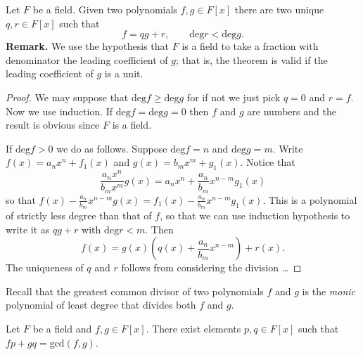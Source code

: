 \begin{theorem}
\label{theorem-division-algoritm-for-polynomials}
\begin{reference}
\cite[Theorem 1.48]{MMST}
\end{reference}
Let $F$ be a field. Given two polynomials $f,g \in F[x]$ there are two unique
$q,r \in F[x]$ such that
$$
f=qg+r,\qquad \text{deg}r<\text{deg}g.
$$
{\bf Remark.} We use the hypothesis that $F$ is a field to take a fraction with
denominator the leading coefficient of $g$; that is, the theorem is valid if the
leading coefficient of $g$ is a unit.
\end{theorem}

\begin{proof}
We may suppose that $\text{deg}f \geq \text{deg}g$ for if not we just pick
$q=0$ and $r=f$. Now we use induction. 
If $\text{deg}f=\text{deg}g=0$ then $f$ and $g$ are numbers and the result is
obvious since $F$ is a field.

If $\text{deg}f>0$ we do as follows. Suppose $\text{deg}f=n$ and
$\text{deg}g=m$. Write $f(x)=a_nx^n+f_1(x)$ and $g(x)=b_mx^m+g_1(x)$. Notice
that
$$
\frac{a_nx^n}{b_mx^m}g(x)=a_nx^n+\frac{a_n}{b_m}x^{n-m}g_1(x)
$$
so that $f(x)-\frac{a_n}{b_m}x^{n-m}g(x)=f_1(x)-\frac{a_n}{b_m}x^{n-m}g_1(x)$.
This is a polynomial of strictly less degree than that of $f$, so that we can
use induction hypothesis to write it as $qg+r$ with $\text{deg}r<m$. Then
$$
f(x)=g(x)\left(q(x)+\frac{a_n}{b_m}x^{n-m}\right)+r(x).
$$
The uniqueness of $q$ and $r$ follows from considering the division  …
\end{proof}

Recall that the greatest common divisor of two polynomials $f$ and $g$ 
is the {\it monic}
polynomial of least degree that divides both $f$ and $g$.

\begin{theorem}
\label{theorem-Bachet-Bezout-for-polynomials-over-field}
\begin{reference}
\cite[Theorem 1.53]{MMST}
\end{reference}
Let $F$ be a field and $f,g\in F[x]$. 
There exist elements  $p,q \in F[x]$ such that $fp+gq=\text{gcd}(f,g)$.
\end{theorem}

